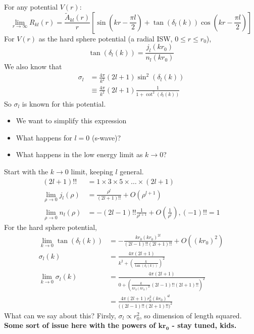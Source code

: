 \documentclass[a4paper, 11pt, normalem]{report}
\begin{document}
\chapter{}
For any potential $V(r)$:
\begin{equation}
    \lim_{r\to\infty} R_{kl}(r) = \frac{\tilde{A}_{kl}(r)}{r}\left[\sin\left(kr-\frac{\pi l}{2}\right) + \tan(\delta_l(k))\cos\left(kr-\frac{\pi l}{2}\right)\right]
\end{equation}
For $V(r)$ as the hard sphere potential (a radial ISW, $0\leq r\leq r_0$),
\begin{equation}
    \tan(\delta_l(k)) = \frac{j_l(kr_0)}{n_l(kr_0)}
\end{equation}
We also know that
\begin{align}
    \sigma_l &= \frac{4\pi}{k^2}(2l+1)\sin^2(\delta_l(k)) \\
             &\equiv \frac{4\pi}{k^2}(2l+1)\frac{1}{1+\cot^2(\delta_l(k))}
\end{align}
So $\sigma_l$ is known for this potential.
\begin{itemize}
    \item We want to simplify this expression
    \item What happens for $l=0$ (s-wave)?
    \item What happens in the low energy limit as $k\to0$?
\end{itemize}
Start with the $k\to0$ limit, keeping $l$ general.
\begin{align}
    (2l+1)!! &= 1\times3\times5\times\dots\times(2l+1) \\
    \lim_{\rho\to0} j_l(\rho) &= \frac{\rho^l}{(2l+1)!!} + O(\rho^{l+1}) \\
    \lim_{\rho\to0} n_l(\rho) &= -(2l-1)!!\frac{1}{\rho^{l+1}} + O\left(\frac{1}{\rho^l}\right), (-1)!! = 1
\end{align}
For the hard sphere potential,
\begin{align}
    \lim_{k\to0} \tan(\delta_l(k)) &= -\frac{kr_0 (kr_0)^{2l}}{(2l-1)!!(2l+1)!!} + O((kr_0)^2) \\
    \sigma_l(k) &= \frac{4\pi(2l+1)}{k^2+\left(\frac{k}{\tan(\delta_l(k))}\right)^2} \\
    \lim_{k\to0} \sigma_l(k) &= \frac{4\pi(2l+1)}{0 + \left(\frac{k}{kr_0(kr_0)^{2l}}(2l-1)!!(2l+1)!!\right)^2} \\
                             &= \frac{4\pi(2l+1)r_0^2(kr_0)^{4l}}{\big((2l-1)!!(2l+1)!!\big)^2}
\end{align}
What can we say about this?
Firsly, $\sigma_l \propto r_0^2$, so dimension of length squared.
\textbf{Some sort of issue here with the powers of $\mathbf{kr_0}$ - stay tuned, kids.}
\end{document}
